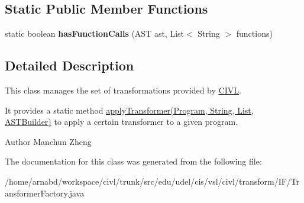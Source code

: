 \subsection*{Static Public Member Functions}
\begin{DoxyCompactItemize}
\item 
\hypertarget{classedu_1_1udel_1_1cis_1_1vsl_1_1civl_1_1transform_1_1IF_1_1TransformerFactory_aab1284f365cda4c8435a73c6c281f897}{}static boolean {\bfseries has\+Function\+Calls} (A\+S\+T ast, List$<$ String $>$ functions)\label{classedu_1_1udel_1_1cis_1_1vsl_1_1civl_1_1transform_1_1IF_1_1TransformerFactory_aab1284f365cda4c8435a73c6c281f897}

\end{DoxyCompactItemize}


\subsection{Detailed Description}
This class manages the set of transformations provided by \hyperlink{classedu_1_1udel_1_1cis_1_1vsl_1_1civl_1_1CIVL}{C\+I\+V\+L}. 

It provides a static method \hyperlink{}{apply\+Transformer(\+Program, String, List, A\+S\+T\+Builder)} to apply a certain transformer to a given program.

\begin{DoxyAuthor}{Author}
Manchun Zheng 
\end{DoxyAuthor}


The documentation for this class was generated from the following file\+:\begin{DoxyCompactItemize}
\item 
/home/arnabd/workspace/civl/trunk/src/edu/udel/cis/vsl/civl/transform/\+I\+F/Transformer\+Factory.\+java\end{DoxyCompactItemize}
